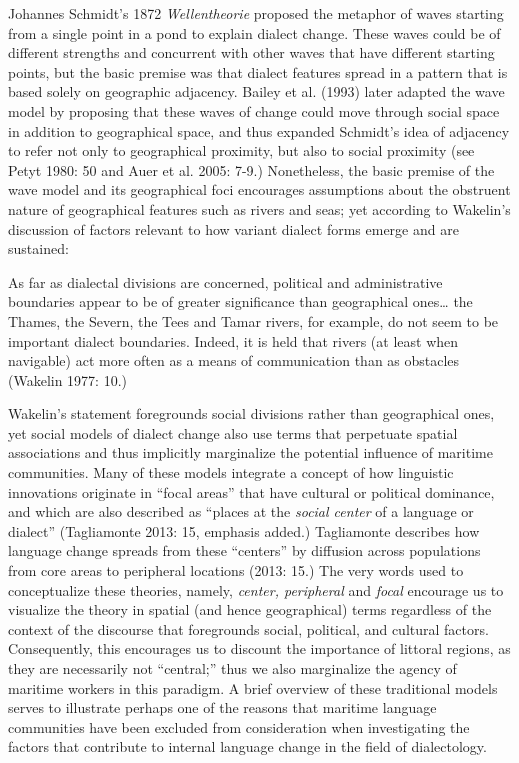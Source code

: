 \begin{styleStandard}
Johannes Schmidt’s 1872 \textit{Wellentheorie} proposed the metaphor of waves starting from a single point in a pond to explain dialect change. These waves could be of different strengths and concurrent with other waves that have different starting points, but the basic premise was that dialect features spread in a pattern that is based solely on geographic adjacency. Bailey et al. (1993) later adapted the wave model by proposing that these waves of change could move through social space in addition to geographical space, and thus expanded Schmidt’s idea of adjacency to refer not only to geographical proximity, but also to social proximity (see Petyt 1980: 50 and Auer et al. 2005: 7-9.) Nonetheless, the basic premise of the wave model and its geographical foci encourages assumptions about the obstruent nature of geographical features such as rivers and seas; yet according to Wakelin’s discussion of factors relevant to how variant dialect forms emerge and are sustained: 
\end{styleStandard}

\begin{styleStandard}
As far as dialectal divisions are concerned, political and administrative boundaries appear to be of greater significance than geographical ones… the Thames, the Severn, the Tees and Tamar rivers, for example, do not seem to be important dialect boundaries. Indeed, it is held that rivers (at least when navigable) act more often as a means of communication than as obstacles (Wakelin 1977: 10.)
\end{styleStandard}

\begin{styleStandard}
Wakelin’s statement foregrounds social divisions rather than geographical ones, yet social models of dialect change also use terms that perpetuate spatial associations and thus implicitly marginalize the potential influence of maritime communities. Many of these models integrate a concept of how linguistic innovations originate in “focal areas” that have cultural or political dominance, and which are also described as “places at the \textit{social center} of a language or dialect” (Tagliamonte 2013: 15, emphasis added.) Tagliamonte describes how language change spreads from these “centers” by diffusion across populations from core areas to peripheral locations (2013: 15.) The very words used to conceptualize these theories, namely, \textit{center, peripheral }and\textit{ focal} encourage us to visualize the theory in spatial (and hence geographical) terms regardless of the context of the discourse that foregrounds social, political, and cultural factors. Consequently, this encourages us to discount the importance of littoral regions, as they are necessarily not “central;” thus we also marginalize the agency of maritime workers in this paradigm. A brief overview of these traditional models serves to illustrate perhaps one of the reasons that maritime language communities have been excluded from consideration when investigating the factors that contribute to internal language change in the field of dialectology. 
\end{styleStandard}

